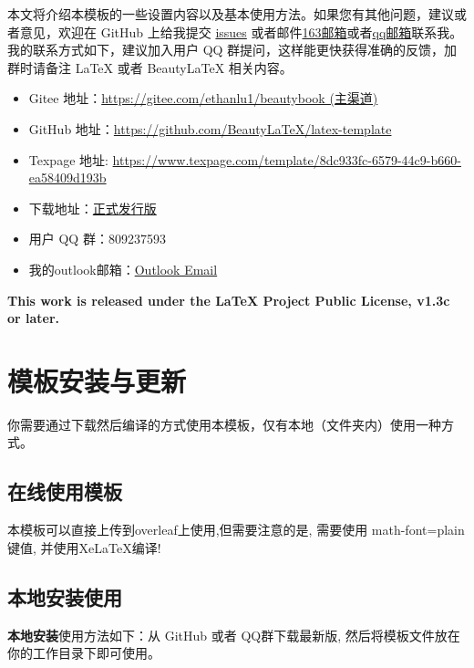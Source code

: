 \documentclass[lang=cn,zihao=-4,a4paper,fontset=none]{beautybook}
\begin{document}
本文将介绍本模板的一些设置内容以及基本使用方法。如果您有其他问题，建议或者意见，欢迎在 GitHub 上给我提交 \href{https://github.com/BeautyLaTeX/latex-template/issues}{issues} 或者邮件\href{h1479840692@163.com}{163邮箱}或者\href{1479840692@qq.com}{qq邮箱}联系我。我的联系方式如下，建议加入用户 QQ 群提问，这样能更快获得准确的反馈，加群时请备注 \LaTeX{} 或者 Beauty\LaTeX{} 相关内容。
\begin{itemize}
    \item Gitee 地址：\href{https://gitee.com/ethanlu1/beautybook}{https://gitee.com/ethanlu1/beautybook (主渠道)}
    \item GitHub 地址：\href{https://github.com/BeautyLaTeX/latex-template}{https://github.com/BeautyLaTeX/latex-template}
    \item Texpage 地址: \href{https://www.texpage.com/template/8dc933fc-6579-44c9-b660-ea58409d193b}{https://www.texpage.com/template/8dc933fc-6579-44c9-b660-ea58409d193b}
    \item 下载地址：\href{https://github.com/BeautyLaTeX/latex-template/releases}{正式发行版}
    \item 用户 QQ 群：809237593
    \item 我的outlook邮箱：\href{https://h1479840692@outlook.com}{Outlook Email}
\end{itemize}
\textbf{This work is released under the LaTeX Project Public License, v1.3c or later.}

\section{模板安装与更新}

你需要通过下载然后编译的方式使用本模板，仅有本地（文件夹内）使用一种方式。

\subsection{在线使用模板}
本模板可以直接上传到overleaf上使用,但需要注意的是, 需要使用 math-font=plain 键值, 并使用XeLaTeX编译!
\newpage
\subsection{本地安装使用}

\textbf{本地安装}使用方法如下：从 GitHub 或者 QQ群下载最新版, 然后将模板文件放在你的工作目录下即可使用。
\end{document}
